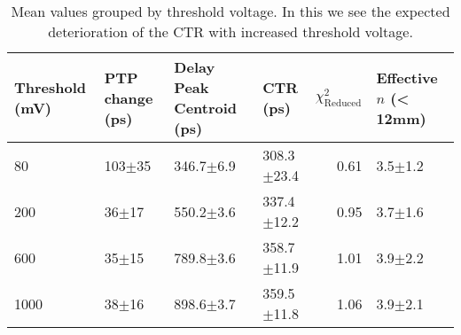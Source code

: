 \begin{table}
\caption{\label{tab:thresholdtest} Mean values grouped by threshold voltage. In this we see the expected deterioration of the CTR with increased threshold voltage.}
\begin{tabular}{llllrl}
\hline
Threshold (mV) & PTP change (ps) & Delay Peak Centroid (ps) & CTR (ps) & $\chi^2_\text{Reduced}$ & Effective $n$ (< 12mm)\\
\hline
80        &  103$\pm$35 &  346.7$\pm$6.9 &  308.3$\pm$23.4 &        0.61 & 3.5$\pm$1.2 \\
200       &   36$\pm$17 &  550.2$\pm$3.6 &  337.4$\pm$12.2 &        0.95 & 3.7$\pm$1.6 \\
600       &   35$\pm$15 &  789.8$\pm$3.6 &  358.7$\pm$11.9 &        1.01 & 3.9$\pm$2.2 \\
1000      &   38$\pm$16 &  898.6$\pm$3.7 &  359.5$\pm$11.8 &        1.06 & 3.9$\pm$2.1 \\
\hline
\end{tabular}
\end{table}